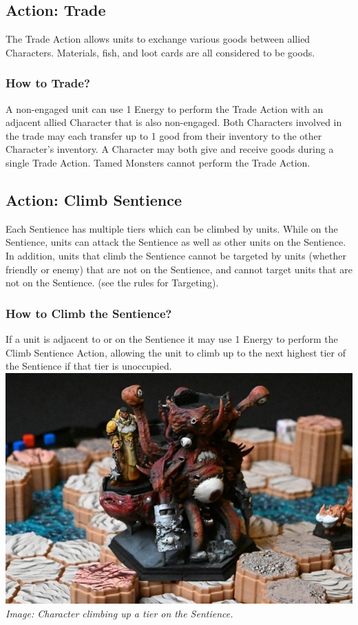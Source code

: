 \documentclass[../main.tex]{subfiles}
\begin{document}
\subsection{Action: Trade}
The Trade Action allows units to exchange various goods between allied Characters. Materials, fish, and loot cards are all considered to be goods.

\subsubsection{How to Trade? }
A non-engaged unit can use 1 Energy to perform the Trade Action with an adjacent allied Character that is also non-engaged. Both Characters involved in the trade may each transfer up to 1 good from their inventory to the other Character’s inventory. A Character may both give and receive goods during a single Trade Action. Tamed Monsters cannot perform the Trade Action.

\subsection{Action: Climb Sentience}
Each Sentience has multiple tiers which can be climbed by units. While on the Sentience, units can attack the Sentience as well as other units on the Sentience. In addition, units that climb the Sentience cannot be targeted by units (whether friendly or enemy) that are not on the Sentience, and cannot target units that are not on the Sentience. (see the rules for Targeting). 

\subsubsection{How to Climb the Sentience?}
If a unit is adjacent to or on the Sentience it may use 1 Energy to perform the Climb Sentience Action, allowing the unit to climb up to the next highest tier of the Sentience if that tier is unoccupied.
\centering
    \includegraphics[width=1\linewidth]{chapters//ActionsandEnergy/TimeStrikeClimbSentience.jpg}
\textit{Image: Character climbing up a tier on the Sentience.}
\end{document}
